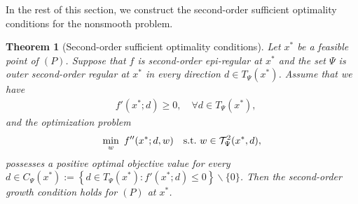 \documentclass[11pt]{article}
\newtheorem{theorem}{Theorem}[section]
\theoremstyle{definition}
\theoremstyle{remark}
\numberwithin{equation}{section}
\begin{document}
 In the rest of this section, we construct the second-order sufficient optimality conditions for the nonsmooth problem.

\begin{theorem}[Second-order sufficient optimality conditions]\label{thm SOSC for
nonsmooth}
Let $x^*$ be a feasible point of $(P)$. Suppose that $f$ is  %
    second-order
 epi-regular at $x^*$ and the set $\Psi$ is outer second-order regular at $x^*$ in every direction  $d\in T_{\Psi}(x^*)$.
 Assume that  we have
 \begin{align}\label{thm f' ge 0}
   & f'(x^*;d)\ge 0, \quad \forall d\in T_{\Psi}(x^*),
 \end{align}
 and  the optimization problem
   \begin{align}\label{thm p f''}
    \min_{w}~ f''(x^*;d,w) ~~~{\rm s.t.}~w\in \mathcal{T}_{\Psi}^2(x^*,d),
   \end{align}
possesses a positive optimal objective value for every $d\in C_{\Psi}(x^*):=\left\{d\in T_{\Psi}(x^*): f'(x^*;d)\le
   0\right\}  \backslash \{0\}$. Then the
second-order growth condition holds for $(P)$ at $x^*$.
\end{theorem}
\end{document}
